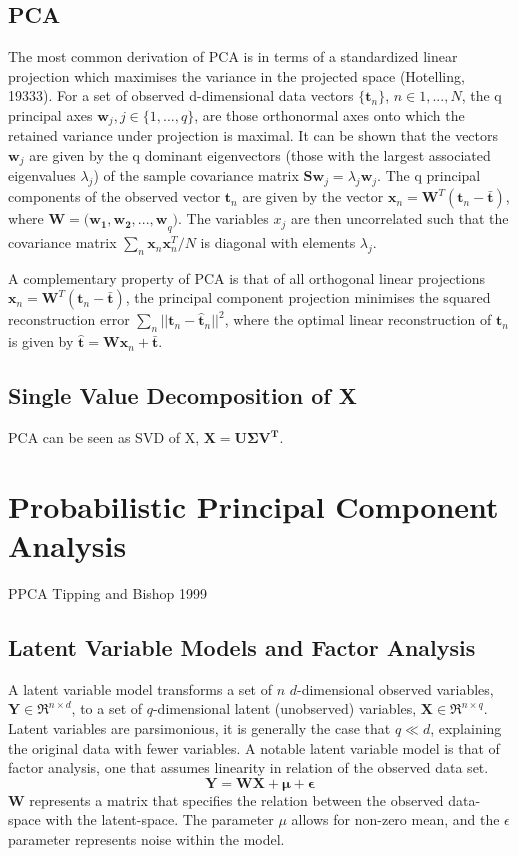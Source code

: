 \documentclass[ %
                    author={Dillon Keith Diep},
                supervisor={Dr. Carl Henrik Ek},
                    degree={MEng},
                     title={Assisted Content Generation for 3D Hair Geometry},
                  subtitle={[INCOMPLETE DRAFT, CONTAINS NOTES FROM RESEARCH]},
                      type={Research},
                      year={2014} ]{dissertation}
\begin{document}
\subsection{PCA}
The most common derivation of PCA is in terms of a standardized linear projection which maximises the variance in the projected space (Hotelling, 19333). For a set of observed d-dimensional data vectors $\{\mathbf{t}_n\}$, $n\in {1,...,N}$, the q principal axes $\mathbf{w}_j, j\in \{1,...,q\}$, are those orthonormal axes onto which the retained variance under projection is maximal. It can be shown that the vectors $\mathbf{w}_j$ are given by the q dominant eigenvectors (those with the largest associated eigenvalues $\lambda_j$) of the sample covariance matrix $\mathbf{Sw}_j=\lambda_j\mathbf{w}_j$. The q principal components of the observed vector $\mathbf{t}_n$ are given by the vector $\mathbf{x}_n=\mathbf{W}^T(\mathbf{t}_n-\mathbf{\bar{t}})$, where $\mathbf{W=(w_1,w_2,...,w}_q)$. The variables $x_j$ are then uncorrelated such that the covariance matrix $\sum_n\mathbf{x}_n\mathbf{x}^T_n /N$ is diagonal with elements $\lambda_j$.

A complementary property of PCA is that of all orthogonal linear projections $\mathbf{x}_n=\mathbf{W}^T(\mathbf{t}_n-\mathbf{\bar{t}})$, the principal component projection minimises the squared reconstruction error $\sum_n||\mathbf{t}_n-\mathbf{\hat{t}}_n||^2$, where the optimal linear reconstruction of $\mathbf{t}_n$ is given by $\mathbf{\hat{t}=Wx}_n+\mathbf{\bar{t}}$.

\subsection{Single Value Decomposition of X}
PCA can be seen as SVD of X, $\mathbf{X=U\Sigma V^T}$.

\vspace{5cm}
\section{Probabilistic Principal Component Analysis}
PPCA Tipping and Bishop 1999
\subsection{Latent Variable Models and Factor Analysis}
A latent variable model transforms a set of $n$ $d$-dimensional observed variables, $\mathbf{Y}\in\Re^{n \times d}$, to a set of $q$-dimensional latent (unobserved) variables, $\mathbf{X}\in\Re^{n \times q}$. Latent variables are parsimonious, it is generally the case that $q \ll d$, explaining the original data with fewer variables. A notable latent variable model is that of factor analysis, one that assumes linearity in relation of the observed data set.
\begin{equation} \label{ppca:fa}
	\mathbf{Y=WX+\mu+\epsilon}
\end{equation}
$\mathbf{W}$ represents a matrix that specifies the relation between the observed data-space with the latent-space.
The parameter $\mu$ allows for non-zero mean, and the $\epsilon$ parameter represents noise within the model.
\end{document}
